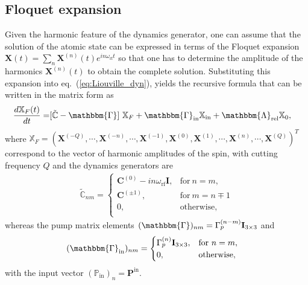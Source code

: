 \documentclass[%
reprint,
 amsmath,amssymb,
 aps,
floatfix,
]{revtex4-1}
\begin{document}
\subsection{Floquet expansion\label{Sup:FloquetExpan} }
Given the harmonic feature of the dynamics generator, one can assume that the solution of the atomic state can be expressed in terms of the Floquet expansion $\mathbf{X}(t)=\sum_n\mathbf{X}^{(n)}(t) e^{in\omega_{\mathrm{rf}} t}$ so that one has to determine the amplitude of the harmonics $\mathbf{X}^{(n)}(t)$ to obtain the complete solution. Substituting this expansion into eq.~(\ref{eq:Liouville_dyn}), yields the recursive formula that can be written in the matrix form as
\begin{align}
\frac{d\mathbb{X}_F(t)}{dt}=&[\tilde{\mathbb{C}}-\mathbbm{\Gamma}]\ \mathbb{X}_F+ \mathbbm{\Gamma}_\mathrm{in} \mathbb{X}_\mathrm{in}+\mathbbm{\Lambda}_\mathrm{rel} \mathbb{X}_{0},
\end{align}
where $\mathbb{X}_F=(\mathbf{X}^{(-Q)},\allowbreak\cdots,\allowbreak\mathbf{X}^{(-n)},\allowbreak\cdots,\allowbreak\mathbf{X}^{(-1)},\allowbreak\mathbf{X}^{(0)},\allowbreak\mathbf{X}^{(1)},\allowbreak\cdots,\mathbf{X}^{(n)},\allowbreak\cdots,\allowbreak\mathbf{X}^{(Q)})^T$ correspond to the vector of harmonic amplitudes of the spin, with cutting frequency $Q$ and the dynamics generators are
\begin{align}
\tilde{\mathbb{C}}_{nm}=\begin{cases}
      \mathbf{C}^{(0)}-in\omega_\mathrm{rf} \mathbf{I}, & \text{for}\ n=m, \\
      \mathbf{C}^{(\pm1)}, & \text{for}\ m=n\mp1 \\
      0, & \text{otherwise}, \\
    \end{cases}
\end{align}
whereas the pump matrix elements $(\mathbbm{\Gamma})_{nm}=\Gamma_p^{(n-m)}\mathbf{I}_{3\times3}$
and 
\begin{align}
(\mathbbm{\Gamma}_\mathrm{in})_{nm}&=\begin{cases}
      \Gamma_p^{(n)}\mathbf{I}_{3\times3}, & \text{for}\ n=m, \\
      0, & \text{otherwise}, \\
    \end{cases}
\end{align}
with the input vector $(\mathbb{P}_\mathrm{in})_n=\mathbf{P}^\mathrm{in}$.
\end{document}
